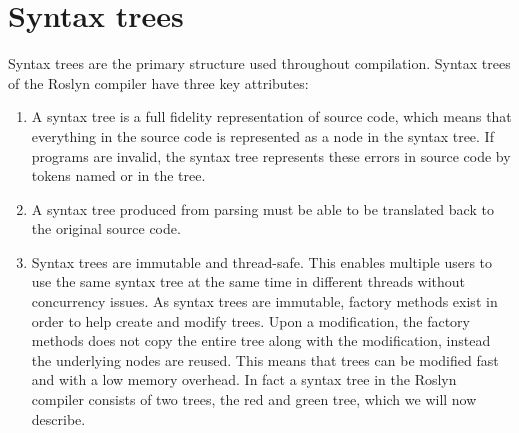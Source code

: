 \section{Syntax trees}\label{sec:syntax_trees}
Syntax trees are the primary structure used throughout compilation. Syntax trees of the Roslyn compiler have three key attributes\cite[p. 6]{ng2012roslyn}: 
\begin{enumerate}
	\item A syntax tree is a full fidelity representation of source code, which means that everything in the source code is represented as a node in the syntax tree. If programs are invalid, the syntax tree represents these errors in source code by tokens named  or  in the tree. 
	\item A syntax tree produced from parsing must be able to be translated back to the original source code.
	\item Syntax trees are immutable and thread-safe. This enables multiple users to use the same syntax tree at the same time in different threads without concurrency issues. As syntax trees are immutable, factory methods exist in order to help create and modify trees. Upon a modification, the factory methods does not copy the entire tree along with the modification, instead the underlying nodes are reused. This means that trees can be modified fast and with a low memory overhead. In fact a syntax tree in the Roslyn compiler consists of two trees, the red and green tree, which we will now describe.
\end{enumerate}

